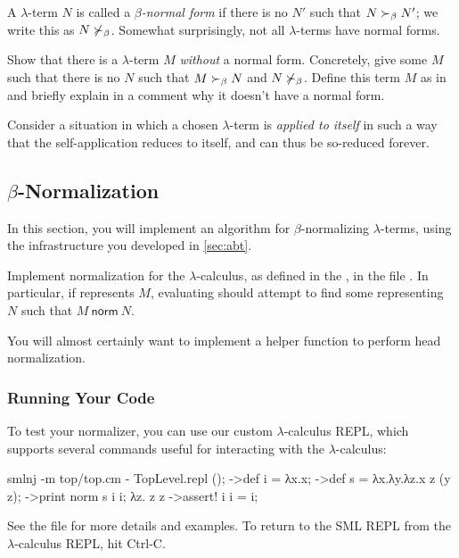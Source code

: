 \documentclass[11pt]{article}
\begin{document}
A $\lambda$-term $N$ is called a \emph{$\beta$-normal form} if there is no $N'$ such that ${{N}\mathrel{\succ_\beta}{N'}}$; we write this as ${N}\not\mathrel{\succ_\beta}$.
Somewhat surprisingly, not all $\lambda$-terms have normal forms.

\begin{task}{10}
  Show that there is a $\lambda$-term $M$ \emph{without} a normal form.
  Concretely, give some $M$ such that there is no $N$ such that ${M}\mathrel{\succ_\beta}{N}$ and ${N}\not\mathrel{\succ_\beta}$.
  Define this term $M$ as  in  and briefly explain in a comment why it doesn't have a normal form.
\end{task}
\begin{hint}
  Consider a situation in which a chosen $\lambda$-term is \emph{applied to itself} in such a way that the self-application reduces to itself, and can thus be so-reduced forever.
\end{hint}

\subsection[Beta-Normalization]{$\beta$-Normalization}\label{sec:norm}

In this section, you will implement an algorithm for $\beta$-normalizing $\lambda$-terms, using the infrastructure you developed in \cref{sec:abt}.

\begin{task}{30}
  Implement normalization for the $\lambda$-calculus, as defined in the \Supplement, in the file .
  In particular, if  represents $M$, evaluating  should attempt to find some  representing $N$ such that ${M\ \textsf{norm}\ N}$.
\end{task}
\begin{hint}
  You will almost certainly want to implement a helper function  to perform head normalization.
\end{hint}

\subsubsection*{Running Your Code}

To test your normalizer, you can use our custom $\lambda$-calculus REPL, which supports several commands useful for interacting with the $\lambda$-calculus:
\begin{codeblock}
  smlnj -m top/top.cm
  - TopLevel.repl ();
  ->def i = λx.x;
  ->def s = λx.λy.λz.x z (y z);
  ->print norm s i i;
  λz. z z
  ->assert! i i = i;
\end{codeblock}
See the  file for more details and examples.
To return to the SML REPL from the $\lambda$-calculus REPL, hit Ctrl-C.
\end{document}
